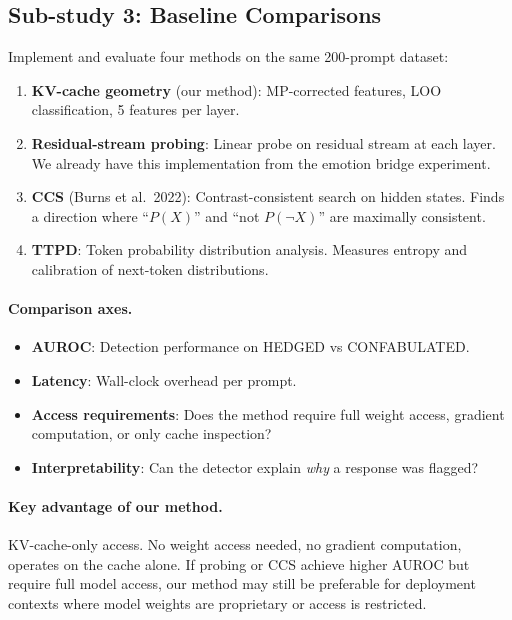 \documentclass[11pt,letterpaper]{article}
\begin{document}
\subsection{Sub-study 3: Baseline Comparisons}

Implement and evaluate four methods on the same 200-prompt dataset:

\begin{enumerate}[leftmargin=*]
  \item \textbf{KV-cache geometry} (our method): MP-corrected features,
    LOO classification, 5 features per layer.
  \item \textbf{Residual-stream probing}: Linear probe on residual
    stream at each layer. We already have this implementation from the
    emotion bridge experiment.
  \item \textbf{CCS} (Burns et al.\ 2022): Contrast-consistent search on
    hidden states. Finds a direction where ``$P(X)$'' and ``not
    $P(\neg X)$'' are maximally consistent.
  \item \textbf{TTPD}: Token probability distribution analysis. Measures
    entropy and calibration of next-token distributions.
\end{enumerate}

\paragraph{Comparison axes.}
\begin{itemize}
  \item \textbf{AUROC}: Detection performance on HEDGED vs CONFABULATED.
  \item \textbf{Latency}: Wall-clock overhead per prompt.
  \item \textbf{Access requirements}: Does the method require full weight
    access, gradient computation, or only cache inspection?
  \item \textbf{Interpretability}: Can the detector explain \emph{why} a
    response was flagged?
\end{itemize}

\paragraph{Key advantage of our method.} KV-cache-only access. No weight
access needed, no gradient computation, operates on the cache alone. If
probing or CCS achieve higher AUROC but require full model access, our
method may still be preferable for deployment contexts where model
weights are proprietary or access is restricted.
\end{document}
